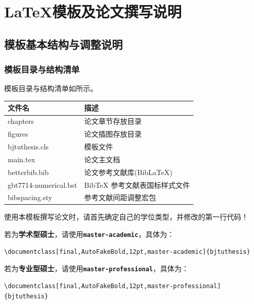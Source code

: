 \chapter{\LaTeX{}模板及论文撰写说明}\label{cha:3}

\section{模板基本结构与调整说明}

\subsection{模板目录与结构清单}
模板目录与结构清单如所示。


\begin{table}[H]\wuhao
  \centering
  \renewcommand\arraystretch{0.8} %
  \begin{tabular}{ll}
    \toprule
    文件名          & 描述                         \\
    \midrule
    chapters & 论文章节存放目录  \\
    figures & 论文插图存放目录        \\
    bjtuthesis.cls   & 模板文件                     \\
    main.tex & 论文主文档    \\
    betterbib.bib & 论文参考文献库(BibLaTeX)        \\
    gbt7714-numerical.bst & BibTeX 参考文献表国标样式文件    \\
    bibspacing.sty & 参考文献间距调整宏包  \\
    \bottomrule
  \end{tabular}
  \label{模板目录与结构清单}
\end{table}

使用本模板撰写论文时，请首先确定自己的学位类型，并修改的第一行代码！

若为\textbf{学术型硕士}，请使用\texttt{\textbf{master-academic}}，具体为：
\begin{lstlisting}[language={[LaTeX]TeX}]
    \documentclass[final,AutoFakeBold,12pt,master-academic]{bjtuthesis}
\end{lstlisting}

若为\textbf{专业型硕士}，请使用\texttt{\textbf{master-professional}}，具体为：
\begin{lstlisting}[language={[LaTeX]TeX}]
    \documentclass[final,AutoFakeBold,12pt,master-professional]{bjtuthesis}
\end{lstlisting}

